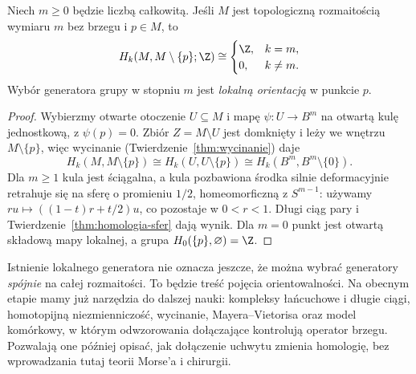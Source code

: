 \begin{stwierdzenie}
\label{prop:lokalna-homologia}
Niech $m\geq0$ będzie liczbą całkowitą.
Jeśli $M$ jest topologiczną
rozmaitością wymiaru $m$
bez brzegu i $p\in M$, to
\[
 H_k(M,M\setminus\{p\};\Z)
 \cong
 \begin{cases}\Z,&k=m,\\0,&k\ne m.\end{cases}
\]
Wybór generatora grupy w stopniu $m$
jest \emph{lokalną orientacją}
w punkcie $p$.
\end{stwierdzenie}
\begin{proof}
Wybierzmy otwarte otoczenie $U\subseteq M$ i mapę
$\psi:U\to B^m$ na otwartą kulę jednostkową,
z $\psi(p)=0$. Zbiór
$Z=M\setminus U$
jest domknięty i leży
we wnętrzu $M\setminus\{p\}$,
więc wycinanie
(Twierdzenie~\ref{thm:wycinanie})
daje
\[
 H_k(M,M\setminus\{p\})
 \cong H_k(U,U\setminus\{p\})
\cong H_k(B^m,B^m\setminus\{0\}).
\]
Dla $m\geq1$ kula jest
ściągalna, a kula pozbawiona
środka silnie deformacyjnie retrahuje się na sferę
o promieniu $1/2$, homeomorficzną z $S^{m-1}$:
używamy $ru\mapsto((1-t)r+t/2)u$, co pozostaje w $0<r<1$.
Długi ciąg pary i
Twierdzenie~\ref{thm:homologia-sfer}
dają wynik. Dla $m=0$
punkt jest otwartą składową
mapy lokalnej, a grupa
$H_0(\{p\},\varnothing)=\Z$.
\end{proof}

Istnienie lokalnego generatora
nie oznacza jeszcze, że można
wybrać generatory \emph{spójnie}
na całej rozmaitości. To będzie
treść pojęcia orientowalności.
Na obecnym etapie mamy
już narzędzia do dalszej nauki:
kompleksy łańcuchowe i długie ciągi,
homotopijną niezmienniczość,
wycinanie, Mayera--Vietorisa
oraz model komórkowy, w którym
odwzorowania dołączające kontrolują
operator brzegu. Pozwalają one
później opisać, jak dołączenie
uchwytu zmienia homologię,
bez wprowadzania tutaj
teorii Morse'a i chirurgii.

